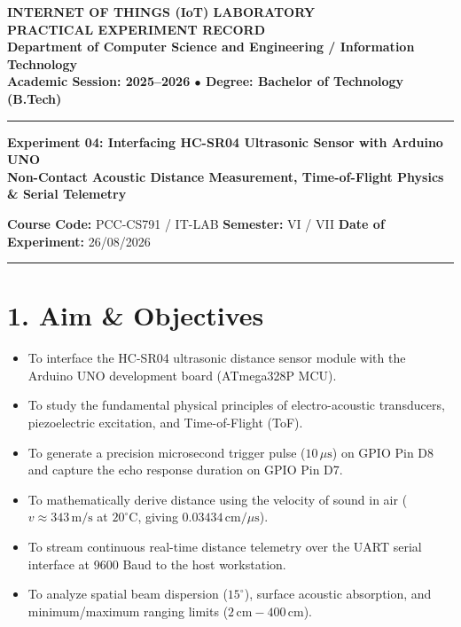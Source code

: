 \documentclass[10pt,a4paper]{article}
\begin{document}
\begin{center}
    {\Large\bfseries INTERNET OF THINGS (IoT) LABORATORY}\\[0.05cm]
    {\large\bfseries PRACTICAL EXPERIMENT RECORD}\\[0.06cm]
    {\footnotesize\textbf{Department of Computer Science and Engineering / Information Technology}}\\[0.02cm]
    {\scriptsize\textbf{Academic Session: 2025--2026 \quad $\bullet$ \quad Degree: Bachelor of Technology (B.Tech)}}
\end{center}
\vspace{-0.32cm}
\rule{\textwidth}{0.8pt}
\vspace{0.08cm}

\begin{center}
    {\large\bfseries Experiment 04: Interfacing HC-SR04 Ultrasonic Sensor with Arduino UNO}\\[0.04cm]
    {\small\textbf{Non-Contact Acoustic Distance Measurement, Time-of-Flight Physics \& Serial Telemetry}}
\end{center}
\vspace{-0.18cm}
\noindent\footnotesize\textbf{Course Code:} PCC-CS791 / IT-LAB \hfill \textbf{Semester:} VI / VII \hfill \textbf{Date of Experiment:} 26/08/2026
\vspace{0.02cm}
\hrule
\vspace{0.10cm}

\section*{1. Aim \& Objectives}
\begin{itemize}[noitemsep]
    \item To interface the HC-SR04 ultrasonic distance sensor module with the Arduino UNO development board (ATmega328P MCU).
    \item To study the fundamental physical principles of electro-acoustic transducers, piezoelectric excitation, and Time-of-Flight (ToF).
    \item To generate a precision microsecond trigger pulse ($10\,\mu\text{s}$) on GPIO Pin D8 and capture the echo response duration on GPIO Pin D7.
    \item To mathematically derive distance using the velocity of sound in air ($v \approx 343\,\text{m/s}$ at $20^\circ\text{C}$, giving $0.03434\,\text{cm}/\mu\text{s}$).
    \item To stream continuous real-time distance telemetry over the UART serial interface at 9600 Baud to the host workstation.
    \item To analyze spatial beam dispersion ($15^\circ$), surface acoustic absorption, and minimum/maximum ranging limits ($2\,\text{cm} - 400\,\text{cm}$).
\end{itemize}
\end{document}

